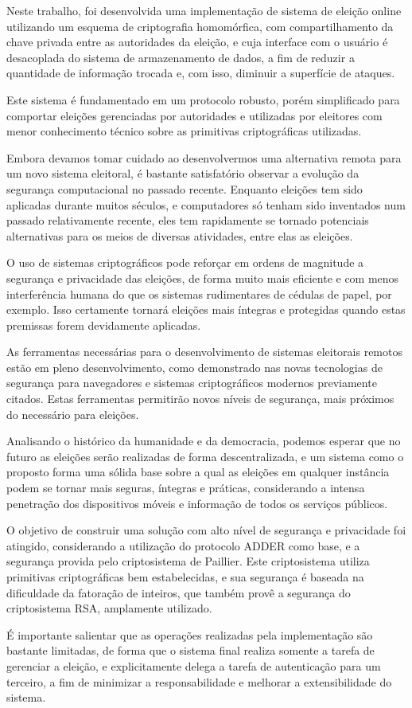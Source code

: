 Neste trabalho, foi desenvolvida uma implementação de sistema de eleição online
utilizando um esquema de criptografia homomórfica, com compartilhamento da
chave privada entre as autoridades da eleição, e cuja interface com o usuário é
desacoplada do sistema de armazenamento de dados, a fim de reduzir a quantidade
de informação trocada e, com isso, diminuir a superfície de ataques.

Este sistema é fundamentado em um protocolo robusto, porém simplificado para
comportar eleições gerenciadas por autoridades e utilizadas por eleitores com
menor conhecimento técnico sobre as primitivas criptográficas utilizadas.

Embora devamos tomar cuidado ao desenvolvermos uma alternativa remota para um
novo sistema eleitoral, é bastante satisfatório observar a evolução da
segurança computacional no passado recente. Enquanto eleições tem sido
aplicadas durante muitos séculos, e computadores só tenham sido inventados num
passado relativamente recente, eles tem rapidamente se tornado potenciais
alternativas para os meios de diversas atividades, entre elas as eleições.

O uso de sistemas criptográficos pode reforçar em ordens de magnitude a
segurança e privacidade das eleições, de forma muito mais eficiente e com menos
interferência humana do que os sistemas rudimentares de cédulas de papel, por
exemplo. Isso certamente tornará eleições mais íntegras e protegidas quando
estas premissas forem devidamente aplicadas.

As ferramentas necessárias para o desenvolvimento de sistemas eleitorais
remotos estão em pleno desenvolvimento, como demonstrado nas novas tecnologias
de segurança para navegadores e sistemas criptográficos modernos previamente
citados. Estas ferramentas permitirão novos níveis de segurança, mais próximos
do necessário para eleições.

Analisando o histórico da humanidade e da democracia, podemos esperar que no
futuro as eleições serão realizadas de forma descentralizada, e um sistema como
o proposto forma uma sólida base sobre a qual as eleições em qualquer instância
podem se tornar mais seguras, íntegras e práticas, considerando a intensa
penetração dos dispositivos móveis e informação de todos os serviços públicos.

O objetivo de construir uma solução com alto nível de segurança e privacidade
foi atingido, considerando a utilização do protocolo ADDER como base, e a
segurança provida pelo criptosistema de Paillier. Este criptosistema utiliza
primitivas criptográficas bem estabelecidas, e sua segurança é baseada na
dificuldade da fatoração de inteiros, que também provê a segurança do
criptosistema RSA, amplamente utilizado.

É importante salientar que as operações realizadas pela implementação são
bastante limitadas, de forma que o sistema final realiza somente a tarefa de
gerenciar a eleição, e explicitamente delega a tarefa de autenticação para um
terceiro, a fim de minimizar a responsabilidade e melhorar a extensibilidade do
sistema.
